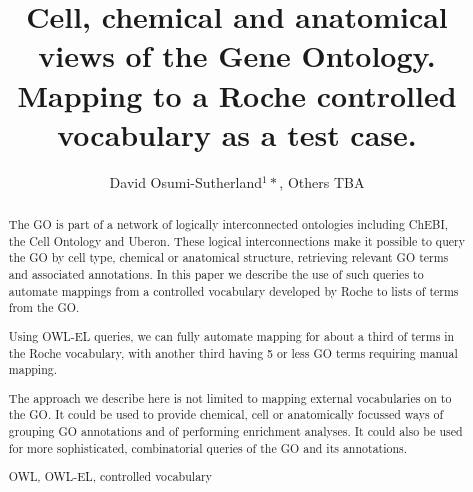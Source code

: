 \documentclass[runningheads,a4paper]{llncs}
\newcommand{\keywords}[1]{\par\addvspace\baselineskip
\noindent\keywordname\enspace\ignorespaces#1}
\begin{document}
\mainmatter  %

\title{Cell, chemical and anatomical views of the Gene Ontology.  Mapping to a Roche controlled vocabulary as a test case.}


%
%
\author{David Osumi-Sutherland$^1*$, Others TBA}  %

%



%
%

\toctitle{}
\tocauthor{}
\maketitle


\begin{abstract}

The \ac{GO} is part of a network of logically interconnected ontologies including \ac{ChEBI}, the Cell Ontology and \ac{Uberon}.  These logical interconnections make it possible to query the \ac{GO} by cell type, chemical or anatomical structure, retrieving relevant \ac{GO} terms and associated annotations.  In this paper we describe the use of such queries to automate mappings from a controlled vocabulary developed by Roche to lists of terms from the \ac{GO}.

Using OWL-EL queries, we can fully automate mapping for about a third of terms in the Roche vocabulary, with another third having 5 or less \ac{GO} terms requiring manual mapping.

The approach we describe here is not limited to mapping external vocabularies on to the \ac{GO}. It could be used to provide chemical, cell or anatomically focussed ways of grouping \ac{GO} annotations and of performing enrichment analyses. It could also be used for more sophisticated, combinatorial queries of the \ac{GO} and its annotations.


\keywords{OWL, OWL-EL, controlled vocabulary}
\end{abstract}
\end{document}
